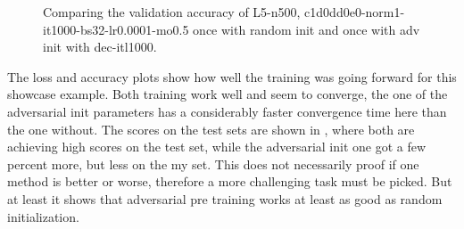 \begin{figure}[!ht]
  \centering
  \caption{Comparing the validation accuracy of L5-n500, c1d0dd0e0-norm1-it1000-bs32-lr0.0001-mo0.5 once with random init and once with adv init with dec-itl1000.}
  \label{fig:exp_adv_fc3_val_acc}
\end{figure}
\FloatBarrier
\noindent

The loss and accuracy plots show how well the training was going forward for this showcase example. Both training work well and seem to converge, the one of the adversarial init parameters has a considerably faster convergence time here than the one without.
The scores on the test sets are shown in , where both are achieving high scores on the test set, while the adversarial init one got a few percent more, but less on the my set.
This does not necessarily proof if one method is better or worse, therefore a more challenging task must be picked.
But at least it shows that adversarial pre training works at least as good as random initialization.

